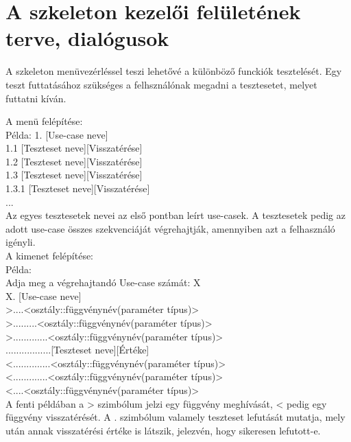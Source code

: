 \section{A szkeleton kezelői felületének terve, dialógusok}
A szkeleton menüvezérléssel teszi lehetővé a különböző funckiók tesztelését. Egy teszt futtatásához szükséges a felhsználónak
megadni a tesztesetet, melyet futtatni kíván. 

A menü felépítése: \\

Példa:
1. [Use-case neve] \\
1.1 [Teszteset neve][Visszatérése] \\
1.2 [Teszteset neve][Visszatérése] \\
1.3 [Teszteset neve][Visszatérése] \\
   1.3.1 [Teszteset neve][Visszatérése] \\
... \\

Az egyes tesztesetek nevei az első pontban leírt use-casek. A tesztesetek pedig
az adott use-case összes szekvenciáját végrehajtják, amennyiben azt a felhasználó igényli. \\

A kimenet felépítése: \\

Példa: \\

Adja meg a végrehajtandó Use-case számát: X \\
X. [Use-case neve] \\
>....<osztály::függvénynév(paraméter típus)> \\
>.........<osztály::függvénynév(paraméter típus)> \\
>.............<osztály::függvénynév(paraméter típus)> \\
.................[Teszteset neve][Értéke] \\
<..............<osztály::függvénynév(paraméter típus)> \\
<.............<osztály::függvénynév(paraméter típus)> \\
<....<osztály::függvénynév(paraméter típus)> \\

A fenti példában a > szimbólum jelzi egy függvény meghívását, < pedig egy függvény
visszatérését. A . szimbólum valamely teszteset lefutását mutatja, mely után annak 
visszatérési értéke is látszik, jelezvén, hogy sikeresen lefutott-e. \\


